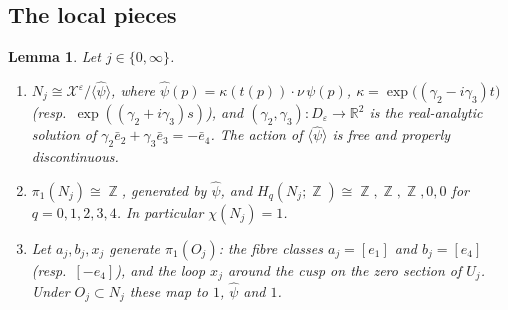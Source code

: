 \documentclass{article}
\DeclareMathOperator{\Z}{\mathbb{Z}}
\newtheorem{lemma}[theorem]{Lemma}
\theoremstyle{definition}
\theoremstyle{plain}
\newcommand{\R}{\mathbb{R}}
\newcommand{\cX}{\mathcal{X}}
\newcommand{\eb}{\bar e}
\begin{document}
\subsection{The local pieces}
\begin{lemma}\label{lem:Nlocal}
Let $j\in\{0,\infty\}$.
\begin{enumerate}
\item $N_j\cong\cX^\varepsilon/\langle\hat\psi\rangle$, where
  $\hat\psi(p)=\kappa(t(p))\cdot \nu\,\psi(p)$, $\kappa=\exp\big((\gamma_2-i\gamma_3)t\big)$
  (resp.\ $\exp((\gamma_2+i\gamma_3)s)$), and $(\gamma_2,\gamma_3)\colon D_\varepsilon\to\R^2$ is the
  real-analytic solution of $\gamma_2\eb_2+\gamma_3\eb_3=-\eb_4$. The action of
  $\langle\hat\psi\rangle$ is free and properly discontinuous.
\item $\pi_1(N_j)\cong\Z$, generated by $\hat\psi$, and
  $H_q(N_j;\Z)\cong\Z,\Z,\Z,0,0$ for $q=0,1,2,3,4$. In particular $\chi(N_j)=1$.
\item Let $a_j,b_j,x_j$ generate $\pi_1(O_j)$: the fibre classes $a_j=[e_1]$ and
  $b_j=[e_4]$ (resp.\ $[-e_4]$), and the loop $x_j$ around the cusp on the zero section
  of $U_j$. Under $O_j\subset N_j$ these map to $1$, $\hat\psi$ and $1$.
\end{enumerate}
\end{lemma}
\end{document}
